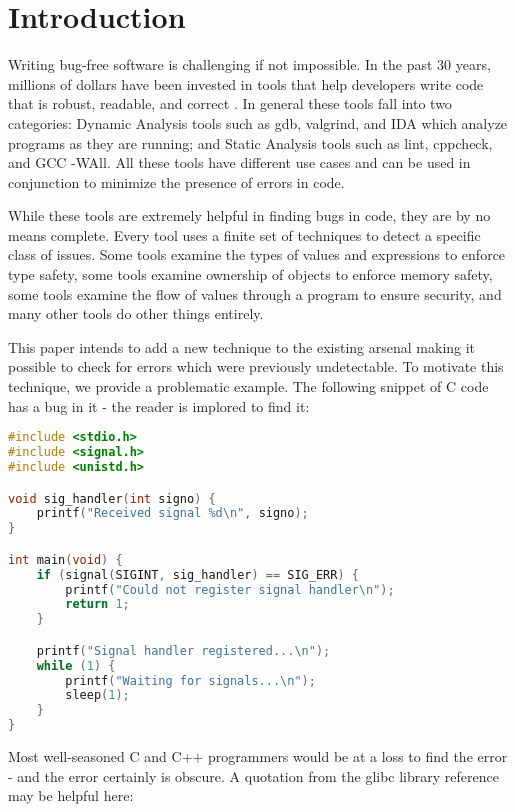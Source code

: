 \chapter{Introduction}\label{sec:intro}

Writing bug-free software is challenging if not impossible.  In the past 30 years, millions of dollars have been invested in tools that help developers write code that is robust, readable, and correct \cite{staticanal}.  In general these tools fall into two categories:  Dynamic Analysis tools such as gdb, valgrind, and IDA which analyze programs as they are running; and Static Analysis tools such as lint, cppcheck, and GCC -WAll.  All these tools have different use cases and can be used in conjunction to minimize the presence of errors in code.

While these tools are extremely helpful in finding bugs in code, they are by no means complete.  Every tool uses a finite set of techniques to detect a specific class of issues.  Some tools examine the types of values and expressions to enforce type safety\cite{staticanal}, some tools examine ownership of objects to enforce memory safety\cite{rust-is-dope}, some tools examine the flow of values through a program to ensure security\cite{jqual-inference}, and many other tools do other things entirely.  

This paper intends to add a new technique to the existing arsenal making it possible to check for errors which were previously undetectable.  To motivate this technique, we provide a problematic example.  The following snippet of C code has a bug in it - the reader is implored to find it:

\begin{minipage}[c]{0.95\textwidth}
\begin{lstlisting}[language=C]
#include <stdio.h>
#include <signal.h>
#include <unistd.h>

void sig_handler(int signo) {
    printf("Received signal %d\n", signo);
}

int main(void) {
    if (signal(SIGINT, sig_handler) == SIG_ERR) {
        printf("Could not register signal handler\n");
        return 1;
    }

    printf("Signal handler registered...\n");
    while (1) {
        printf("Waiting for signals...\n");
        sleep(1);
    }
}
\end{lstlisting}
\end{minipage}

Most well-seasoned C and C++ programmers would be at a loss to find the error - and the error certainly is obscure.  A quotation from the glibc library reference may be helpful here:


